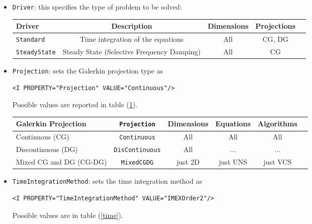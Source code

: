 \begin{itemize}
\item \texttt{Driver}: this specifies the type of problem to be solved:

\begin{table}
\begin{center}
\begin{tabular}{|l|c|c|c|c|} \hline
{Driver} & {Description} &{Dimensions}&{Projections} \\ \hline
\texttt{Standard} & Time integration of the equations & All & CG, DG \\ \hline
\texttt{SteadyState} & Steady State (Selective Frequency Damping)  & All & CG \\ \hline 
\end{tabular}
\end{center}
\end{table}

\item \texttt{Projection}: sets the Galerkin projection type as 
\begin{lstlisting}[style=XMLStyle]
<I PROPERTY="Projection" VALUE="Continuous"/>
\end{lstlisting}

Possible values are reported in table (\ref{proj}).

\begin{table}[!h]
\begin{center}\label{proj}
\begin{tabular}{|l|c|c|c|c|c|} \hline
{Galerkin Projection} & \texttt{Projection} &{Dimensions}&{Equations}&{Algorithms} \\ \hline
Continuous (CG)&  \texttt{Continuous} & All & All & All \\ \hline
Discontinuous (DG) & \texttt{DisContinuous} & All &...&...\\ \hline
Mixed CG and DG (CG-DG) & \texttt{MixedCGDG} & just 2D & just UNS & just VCS \\ \hline
\end{tabular}
\end{center}
\end{table}

\item \texttt{TimeIntegrationMethod}:  sets the time integration method as
\begin{lstlisting}[style=XMLStyle]
<I PROPERTY="TimeIntegrationMethod" VALUE="IMEXOrder2"/>
\end{lstlisting}

Possible values are in table (\ref{time}).


\end{itemize}

